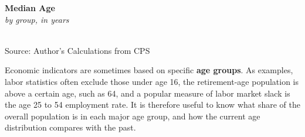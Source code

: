 \documentclass{report}
\makeatletter
\newcommand{\tbllink}[1]{\href{https://raw.githubusercontent.com/bdecon/US-chartbook/master/chartbook/data/#1}{\faTable}}
\newcommand*\short[1]{\expandafter\@gobbletwo\number\numexpr#1\relax}
\newcommand{\absnode}[3]{\node[below right, align=left] at (axis cs: #1,#2) {#3};}
\newcommand{\shdateaxisticks}{
		date coordinates in=x, axis line style={draw=none},
		xmax={2022-10-31},
		max space between ticks=40,	    
		xtick={{1990-01-01}, {1995-01-01}, {2000-01-01}, 
			{2005-01-01}, {2010-01-01}, {2015-01-01}, {2020-01-01}},
		minor xtick={},
		enlarge y limits={0.06}, enlarge x limits={0.01},
		}
\newcommand{\bbar}[2]{extra #1 ticks = {{#2}}, extra #1 tick labels = ,
		extra #1 tick style = {grid=major, grid style={thick, black!25}},}
\newcommand{\stdline}[4]{\addplot[very thick, no markers, color=#1] 
		table [x=#2, y=#3, col sep=comma] {#4};	}
\newcommand{\rbars}{
		\fill[color=black!10] (axis cs:{1990-07-01},\pgfkeysvalueof{/pgfplots/ymin}) rectangle 
			(axis cs:{1991-03-01}, \pgfkeysvalueof{/pgfplots/ymax});
		\fill[color=black!10] (axis cs:{2007-12-01},\pgfkeysvalueof{/pgfplots/ymin}) rectangle 
			(axis cs:{2009-07-01}, \pgfkeysvalueof{/pgfplots/ymax});
		\fill[color=black!10] (axis cs:{2001-03-01},\pgfkeysvalueof{/pgfplots/ymin}) rectangle 
			(axis cs:{2001-11-01}, \pgfkeysvalueof{/pgfplots/ymax});
		\fill[color=black!10] (axis cs:{2020-02-01},\pgfkeysvalueof{/pgfplots/ymin}) rectangle 
			(axis cs:{2020-05-01}, \pgfkeysvalueof{/pgfplots/ymax});}
\makeatother
\begin{document}
{\begin{minipage}{0.76\textwidth}
\begin{minipage}{0.41\textwidth}
\small 
\end{minipage}\hfill
\begin{minipage}{0.53\textwidth}
\normalsize \textbf{Median Age}\\
\footnotesize{\textit{by group, in years}}\\
\noindent \hspace*{-2mm} \\
\footnotesize{Source: Author's Calculations from CPS} \hfill \tbllink{median_age.csv}
\end{minipage}
\vspace{3mm}

\small Economic indicators are sometimes based on specific \textbf{age groups}. As examples, labor statistics often exclude those under age 16, the retirement-age population is above a certain age, such as 64, and a popular measure of labor market slack is the age 25 to 54 employment rate. It is therefore useful to know what share of the overall population is in each major age group, and how the current age distribution compares with the past. 
\end{minipage}
\vspace{0.5mm}

}
\end{document}
